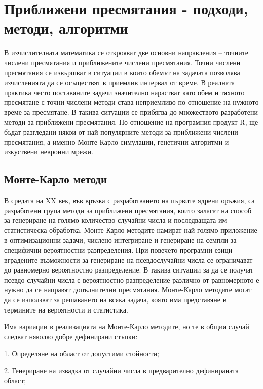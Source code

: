 ﻿\newpage
\chapter{Приближени пресмятания - подходи, методи, алгоритми}
\label{chapter10}
\thispagestyle{empty}

В изчислителната математика се открояват две основни направления – точните числени пресмятания и приближените числени пресмятания. Точни числени пресмятания се извършват в ситуации в които обемът на задачата позволява изчисленията да се осъществят в приемлив интервал от време. В реалната практика често поставяните задачи значително нарастват като обем и тяхното пресмятане с точни числени методи става неприемливо по отношение на нужното време за пресмятане. В такива ситуации се прибягва до множеството разработени методи за приближени пресмятания. По отношение на програмния продукт R, ще бъдат разгледани някои от най-популярните методи за приближени числени пресмятания, а именно Монте-Карло симулации, генетични алгоритми и изкуствени невронни мрежи.

\section{Монте-Карло методи}

В средата на XX век, във връзка с разработването на първите ядрени оръжия, са разработени група методи за приближени пресмятания, които залагат на способ за генериране на голямо количество случайни числа и последващата им статистическа обработка. Монте-Карло методите намират най-голямо приложение в оптимизационни задачи, числено интегриране и генериране на семпли за специфични вероятностни разпределения. При повечето програмни езици вградените възможности за генериране на псевдослучайни числа се ограничават до равномерно вероятностно разпределение. В такива ситуации за да се получат псевдо случайни числа с вероятностно разпределение различно от равномерното е нужно да се направят допълнителни пресмятания. Монте-Карло методите могат да се използват за решаването на всяка задача, която има представяне в термините на вероятности и статистика. 

Има вариации в реализацията на Монте-Карло методите, но те в общия случай следват няколко добре дефинирани стъпки:

1. Определяне на област от допустими стойности;

2. Генериране на извадка от случайни числа в предварително дефинираната област;

